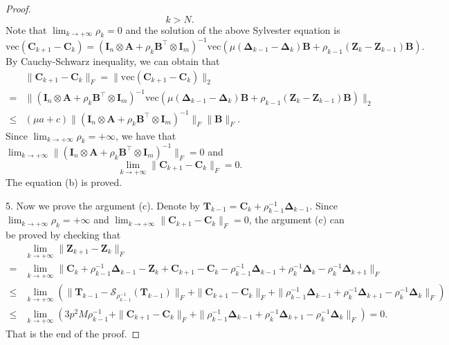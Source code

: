 \begin{proof}
\begin{equation}
k>N.
\end{equation}
Note that $\lim_{k \to +\infty}\rho_{k}=0$ and the solution of the above Sylvester equation is
\begin{equation}
\label{equa8-60}
\text{vec}(\bm{C}_{k+1} - \bm{C}_{k})
=
(\bm{I}_{n}\otimes\mathbf{A}
+
\rho_{k}\bm{B}^{\top}\otimes\mathbf{I}_{m})^{-1}
\text{vec}(\mu(\bm{\Delta}_{k-1}-\bm{\Delta}_{k})\bm{B}+\rho_{k-1}(\bm{Z}_{k}-\bm{Z}_{k-1})\bm{B}).
\end{equation}
By Cauchy-Schwarz inequality, we can obtain that
\begin{align}
&
\|
\bm{C}_{k+1}
-
\bm{C}_{k}
\|_{F}
=
\|
\text{vec}(\bm{C}_{k+1} - \bm{C}_{k})
\|_{2}
\\
=
&
\|
(\bm{I}_{n}\otimes\mathbf{A}
+
\rho_{k}\bm{B}^{\top}\otimes\mathbf{I}_{m})^{-1}
\text{vec}(\mu(\bm{\Delta}_{k-1}-\bm{\Delta}_{k})\bm{B}+\rho_{k-1}(\bm{Z}_{k}-\bm{Z}_{k-1})\bm{B})
\|_{2}
\\
\le
&
(
\mu
a
+
c
)
\|
(\bm{I}_{n}\otimes\mathbf{A}
+
\rho_{k}\bm{B}^{\top}\otimes\mathbf{I}_{m})^{-1}
\|_{F}
\|
\bm{B}
\|_{F}.
\end{align}
Since $\lim_{k \to +\infty}\rho_{k}=+\infty$, we have that 
$\lim_{k \to +\infty} 
\|
(\bm{I}_{n}\otimes\mathbf{A}
+
\rho_{k}\bm{B}^{\top}\otimes\mathbf{I}_{m})^{-1}
\|_{F}=0$ 
and 
\begin{equation}
\label{equa8-64}
\lim_{k \to +\infty} 
\|
\bm{C}_{k+1}-\bm{C}_{k}
\|_{F}
=
0.
\end{equation}
The equation (b) is proved. 


5. Now we prove the argument (c). Denote by $\bm{T}_{k-1}=\bm{C}_{k}+\rho_{k-1}^{-1}\bm{\Delta}_{k-1}$. Since $\lim_{k \to +\infty}\rho_{k}=+\infty$ and $\lim_{k \to +\infty} \|\bm{C}_{k+1}-\bm{C}_{k}\|_{F}=0$, the argument (c) can be proved by checking that 
\begin{align}
&\lim_{k \to +\infty} 
\|
\bm{Z}_{k+1}-\bm{Z}_{k}
\|_{F}
\\
=
&
\lim_{k \to +\infty} 
\|
\bm{C}_{k}+\rho_{k-1}^{-1}\bm{\Delta}_{k-1}-\bm{Z}_{k}
+
\bm{C}_{k+1}-\bm{C}_{k}
-
\rho_{k-1}^{-1}
\bm{\Delta}_{k-1}
+
\rho_{k}^{-1}
\bm{\Delta}_{k}
-
\rho_{k}^{-1}
\bm{\Delta}_{k+1}
\|_{F}
\\
\le
&
\lim_{k \to +\infty} 
(
\|
\bm{T}_{k-1}-\mathcal{S}_{\rho_{k-1}^{-1}}(\bm{T}_{k-1})
\|_{F}
+
\|
\bm{C}_{k+1}-\bm{C}_{k}
\|_{F}
+
\|
\rho_{k-1}^{-1}\bm{\Delta}_{k-1}
+
\rho_{k}^{-1}\bm{\Delta}_{k+1}
-
\rho_{k}^{-1}\bm{\Delta}_{k}
\|_{F}
)
\\
\le
&
\lim_{k \to +\infty} 
(
3p^2M\rho_{k-1}^{-1}
+
\|
\bm{C}_{k+1}-\bm{C}_{k}
\|_{F}
+
\|
\rho_{k-1}^{-1}\bm{\Delta}_{k-1}
+
\rho_{k}^{-1}\bm{\Delta}_{k+1}
-
\rho_{k}^{-1}\bm{\Delta}_{k}
\|_{F}
)
=
0
.
\end{align}
That is the end of the proof.
\end{proof}


